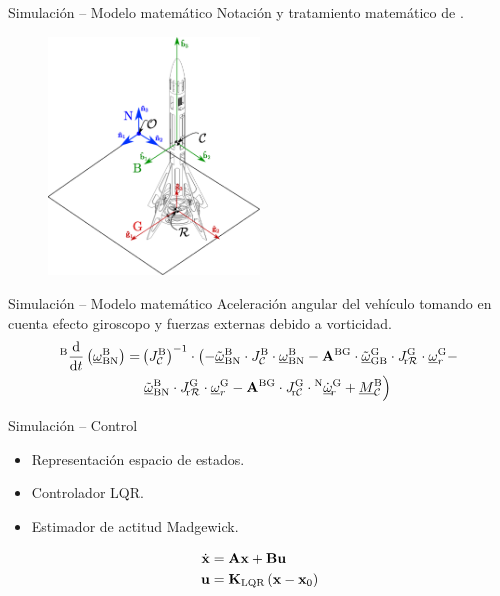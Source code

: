 \documentclass[10pt]{beamer}
\begin{document}
\begin{frame}{Simulación -- Modelo matemático}
    Notación y tratamiento matemático de \cite{hahn2013rigid}.
    
    \begin{figure}[htb!]
        \centering
        \includegraphics[width=0.5\textwidth]{fig/marcosDiagrama.eps}
    \end{figure}
\end{frame}

\begin{frame}{Simulación -- Modelo matemático}
    Aceleración angular del vehículo tomando en cuenta efecto giroscopo y fuerzas externas debido a vorticidad.
    \begin{align*}
        {}^{\mathrm{B}}\frac{\textrm{d} }{\textrm{d} t} \left({ \underline{\omega} }_{\mathrm{BN}}^{\mathrm{B}} \right) = & \left(J_{\mathcal{C}}^{\mathrm{B}}\right)^{-1} \cdot  \left( - \tilde{{ \underline{\omega} }}_{\mathrm{BN}}^{\mathrm{B}} \cdot J_{\mathcal{C}}^{\mathrm{B}}\cdot { \underline{\omega} }_{\mathrm{BN}}^{\mathrm{B}} - \mathbf{A}^{\mathrm{{BG}}} \cdot\tilde{{ \underline{\omega} }}_{\mathrm{GB}}^{\mathrm{G}} \cdot J_{\mathcal{\!\mathrm{r}R}}^{\mathrm{G}}  \cdot { \underline{\omega} }_r^{\mathrm{G}} - \right.\\
     & \left.\tilde{{ \underline{\omega} }}_{\mathrm{BN}}^{\mathrm{B}} \cdot J_{\mathcal{\!\mathrm{r}R}}^{\mathrm{G}}  \cdot { \underline{\omega} }_r^{\mathrm{G}} -  \mathbf{A}^{\mathrm{{BG}}}\cdot  J_{\mathcal{\!\mathrm{r}C}}^{\mathrm{G}} \cdot  {}^{\mathrm{N}} \dot{{ \underline{\omega} }}_{\!r}^{\mathrm{G}} + { \underline{M} }_{\mathcal{C}}^{\mathrm{B}} \right)
     \end{align*}
\end{frame}

\begin{frame}{Simulación -- Control}
    \begin{itemize}
        \item Representación espacio de estados.
        \item Controlador LQR.
        \item Estimador de actitud Madgewick.
    \end{itemize}
    \begin{align}
        \dot{\mathbf{x}} &= \mathbf{A} \mathbf{x} + \mathbf{B} \mathbf{u} \\
        \mathbf{u} &= \mathbf{K}_{\textrm{LQR}} \left(\mathbf{x}-\mathbf{x}_0 \right)
    \end{align}
\end{frame}

\end{document}
